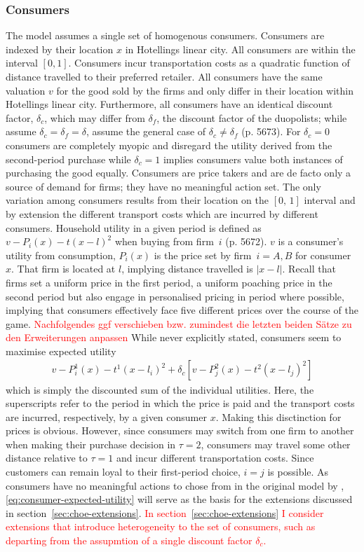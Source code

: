 \documentclass[a4paper, 11 pt, fleqn]{article}
\begin{document}
\subsubsection{Consumers}
The model assumes a single set of homogenous consumers. Consumers are indexed by their location $x$ in Hotellings linear city.
All consumers are within the interval $[0,1]$. Consumers incur transportation costs as a quadratic function of distance travelled
to their preferred retailer. All consumers have the same valuation $v$ for the good sold by the firms and only differ in their location
within Hotellings linear city. Furthermore, all consumers have an identical discount factor, $\delta_c$, which may differ from $\delta_f$,
the discount factor of the duopolists; while \citet{Fudenberg.2000} assume $\delta_c = \delta_f = \delta$, \citet{Choe.2018} assume the
general case of $\delta_c \neq \delta_f$ (p. 5673). For $\delta_c = 0$ consumers are completely myopic and disregard the utility derived
from the second-period purchase while $\delta_c = 1$ implies consumers value both instances of purchasing the good equally.
Consumers are price takers and are de facto only a source of demand for firms; they have no meaningful action set. The only variation
among consumers results from their location on the $[0,\,1]$ interval and by extension the different transport costs which are incurred
by different consumers. Household utility in a given period is defined as $v - P_i(x)-t(x-l)^2$ when buying from firm~$i$ (p. 5672). $v$ is a
consumer's utility from consumption, $P_i(x)$ is the price set by firm~$i = A,B$ for consumer $x$. That firm is located at $l$, implying distance
travelled is $|x-l|$. Recall that firms set a uniform price in the first period, a uniform poaching price in the second period but also engage
in personalised pricing in period where possible, implying that consumers effectively face five different prices over the course of the game.
\textcolor{red}{Nachfolgendes ggf verschieben bzw. zumindest die letzten beiden Sätze zu den Erweiterungen anpassen}
While never explicitly stated, consumers seem to maximise expected utility 
\begin{align} \label{eq:consumer-expected-utility}
	v - P^1_i(x)-t^1(x-l_i)^2 + \delta_c [v - P^2_j(x)-t^2(x-l_j)^2]
\end{align}
which is simply the discounted sum of the individual utilities. Here, the superscripts refer to the period in which the price is paid and the
transport costs are incurred, respectively, by a given consumer $x$. Making this disctinction for prices is obvious. However, since consumers
may switch from one firm to another when making their purchase decision in $\tau = 2$, consumers may travel some other distance relative to
$\tau = 1$ and incur different transportation costs. Since customers can remain loyal to their first-period choice, $i = j$ is possible.
As consumers have no meaningful actions to chose from in the original model by \citet{Choe.2018}, \eqref{eq:consumer-expected-utility} will
serve as the basis for the extensions discussed in section~\ref{sec:choe-extensions}.
\textcolor{red}{In section~\ref{sec:choe-extensions} I consider extensions that introduce heterogeneity to the set of consumers, such as departing
from the assupmtion of a single discount factor $\delta_c$.}
%
\end{document}

